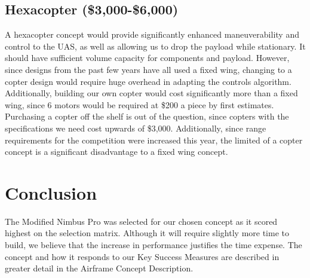 \documentclass[]{auvsi_doc}
\begin{document}
\subsection{Hexacopter (\$3,000-\$6,000)}

A hexacopter concept would provide significantly enhanced maneuverability and control to the UAS, as well as allowing us to drop the payload while stationary. It should have sufficient volume capacity for components and payload. However, since designs from the past few years have all used a fixed wing, changing to a copter design would require huge overhead in adapting the controls algorithm. Additionally, building our own copter would cost significantly more than a fixed wing, since 6 motors would be required at \$200 a piece by first estimates. Purchasing a copter off the shelf is out of the question, since copters with the specifications we need cost upwards of \$3,000. Additionally, since range requirements for the competition were increased this year, the limited of a copter concept is a significant disadvantage to a fixed wing concept.

\section{Conclusion}

The Modified Nimbus Pro was selected for our chosen concept as it scored highest on the selection matrix. Although it will require slightly more time to build, we believe that the increase in performance justifies the time expense. The concept and how it responds to our Key Success Measures are described in greater detail in the Airframe Concept Description.
\end{document}
